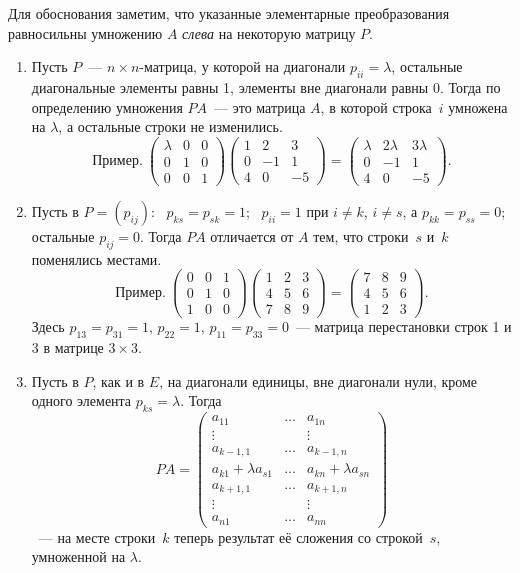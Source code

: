 \documentclass[a4paper,11pt]{article}
\newcommand{\prim}{\textbf{Пример.}\ }
\begin{document}
Для обоснования заметим, что указанные элементарные преобразования равносильны умножению $A$
\emph{слева} на некоторую матрицу $P$.
\begin{enumerate}[label=\arabic*)]
\item Пусть $P$~--- $n\times n$-матрица, у которой на диагонали $p_{ii}=\lambda$, остальные
диагональные элементы равны 1, элементы вне диагонали равны 0. Тогда по определению умножения
$PA$~--- это матрица $A$, в которой строка \textnumero\,$i$ умножена на $\lambda$, а остальные строки
не изменились.
\[
\prim
\begin{pmatrix}\lambda&0&0\\0&1&0\\0&0&1\end{pmatrix}
\begin{pmatrix}1&2&3\\0&-1&1\\4&0&-5\end{pmatrix}
=\begin{pmatrix}\lambda&2\lambda&3\lambda\\0&-1&1\\4&0&-5\end{pmatrix}.
\]
\item Пусть в $P=(p_{ij})$: \ $p_{ks}=p_{sk}=1$; \ $p_{ii}=1$ при $i\ne k$, $i\ne s$, а $p_{kk}=p_{ss}=0$;
остальные $p_{ij}=0$. Тогда $PA$ отличается от $A$ тем, что строки \textnumero\,$s$ и \textnumero\,$k$
поменялись местами.
\[
\prim
\begin{pmatrix}0&0&1\\0&1&0\\1&0&0\end{pmatrix}
\begin{pmatrix}1&2&3\\4&5&6\\7&8&9\end{pmatrix}
=\begin{pmatrix}7&8&9\\4&5&6\\1&2&3\end{pmatrix}.
\]
Здесь $p_{13}=p_{31}=1$, $p_{22}=1$, $p_{11}=p_{33}=0$~--- матрица перестановки строк 1 и 3 в
матрице $3\times3$.
\item Пусть в $P$, как и в $E$, на диагонали единицы, вне диагонали нули, кроме одного элемента
$p_{ks}=\lambda$. Тогда
\[
PA=\begin{pmatrix}
a_{11}&\dots&a_{1n}\\
\vdots&&\vdots\\
a_{k-1,1}&\dots&a_{k-1,n}\\
a_{k1}+\lambda a_{s1}&\dots&a_{kn}+\lambda a_{sn}\\
a_{k+1,1}&\dots&a_{k+1,n}\\
\vdots&&\vdots\\
a_{n1}&\dots&a_{nn}
\end{pmatrix}
\]
~--- на месте строки \textnumero\,$k$ теперь результат её сложения со строкой \textnumero\,$s$,
умноженной на $\lambda$.
\end{enumerate}
\end{document}
